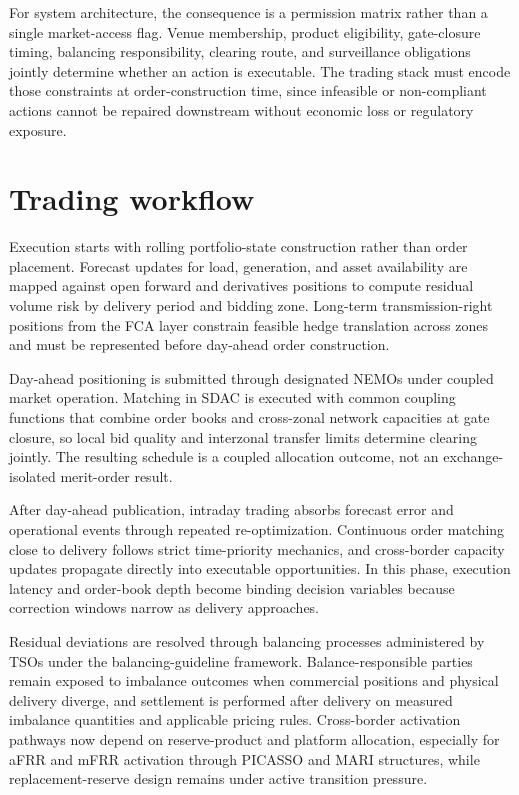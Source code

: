 \documentclass[oneside,10pt]{swissi}
\begin{document}
For system architecture, the consequence is a permission matrix rather than a single market-access flag. Venue membership, product eligibility, gate-closure timing, balancing responsibility, clearing route, and surveillance obligations jointly determine whether an action is executable. The trading stack must encode those constraints at order-construction time, since infeasible or non-compliant actions cannot be repaired downstream without economic loss or regulatory exposure.\cite{acer_nemo_designation_2026,eu_reg_2011_1227_remit,eu_dir_2014_65_mifid2,eu_reg_2014_600_mifir,eu_reg_2012_648_emir}

\section{Trading workflow}
Execution starts with rolling portfolio-state construction rather than order placement. Forecast updates for load, generation, and asset availability are mapped against open forward and derivatives positions to compute residual volume risk by delivery period and bidding zone. Long-term transmission-right positions from the FCA layer constrain feasible hedge translation across zones and must be represented before day-ahead order construction.\cite{eu_reg_2016_1719,eex_power_2026,ice_endex_2026,euronext_nord_pool_power_2026}

Day-ahead positioning is submitted through designated NEMOs under coupled market operation. Matching in SDAC is executed with common coupling functions that combine order books and cross-zonal network capacities at gate closure, so local bid quality and interzonal transfer limits determine clearing jointly. The resulting schedule is a coupled allocation outcome, not an exchange-isolated merit-order result.\cite{acer_nemo_designation_2026,acer_market_coupling_development_2026,nord_pool_day_ahead_2026}

After day-ahead publication, intraday trading absorbs forecast error and operational events through repeated re-optimization. Continuous order matching close to delivery follows strict time-priority mechanics, and cross-border capacity updates propagate directly into executable opportunities. In this phase, execution latency and order-book depth become binding decision variables because correction windows narrow as delivery approaches.\cite{acer_market_coupling_development_2026,nord_pool_intraday_2026}

Residual deviations are resolved through balancing processes administered by TSOs under the balancing-guideline framework. Balance-responsible parties remain exposed to imbalance outcomes when commercial positions and physical delivery diverge, and settlement is performed after delivery on measured imbalance quantities and applicable pricing rules. Cross-border activation pathways now depend on reserve-product and platform allocation, especially for aFRR and mFRR activation through PICASSO and MARI structures, while replacement-reserve design remains under active transition pressure.\cite{ec_network_codes_2026,eu_reg_2019_943,eu_reg_2017_2195_ebgl,entsoe_picasso_2026,entsoe_mari_2026,entsoe_terre_2026}
\end{document}
